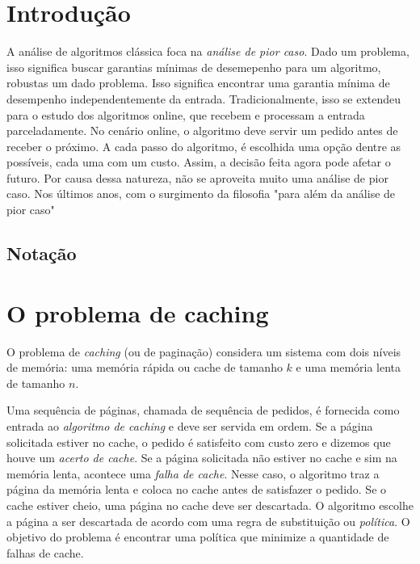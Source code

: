 \chapter{Introdução} 


% 
% 


A análise de algoritmos clássica foca na \emph{análise de pior caso}. Dado um problema, isso significa buscar garantias mínimas de desemepenho para um algoritmo, robustas um dado problema. Isso significa encontrar uma garantia mínima de desempenho independentemente da entrada. Tradicionalmente, isso se extendeu para o estudo dos algoritmos online, que recebem e processam a entrada parceladamente. No cenário online, o algoritmo deve servir um pedido antes de receber o próximo. A cada passo do algoritmo, é escolhida uma opção dentre as possíveis, cada uma com um custo. Assim, a decisão feita agora pode afetar o futuro. Por causa dessa natureza, não se aproveita muito uma análise de pior caso. Nos últimos anos, com o surgimento da filosofia "para além da análise de pior caso" \textcite{Roughgarden19} 

\section{Notação}

\chapter{O problema de caching}

O problema de \emph{caching} (ou de paginação) considera um sistema com dois níveis de memória: uma memória rápida ou cache de tamanho \(k\) e uma memória lenta de tamanho \(n\). 

Uma sequência de páginas, chamada de sequência de pedidos, é fornecida como entrada ao \emph{algoritmo de caching} e deve ser servida em ordem. Se a página solicitada estiver no cache, o pedido é satisfeito com custo zero e dizemos que houve um \emph{acerto de cache}. Se a página solicitada não estiver no cache e sim na memória lenta, acontece uma \emph{falha de cache}. Nesse caso, o algoritmo traz a página da memória lenta e coloca no cache antes de satisfazer o pedido. Se o cache estiver cheio, uma página no cache deve ser descartada. O algoritmo escolhe a página a ser descartada de acordo com uma regra de substituição ou \emph{política}. O objetivo do problema é encontrar uma política que minimize a quantidade de falhas de cache. 


